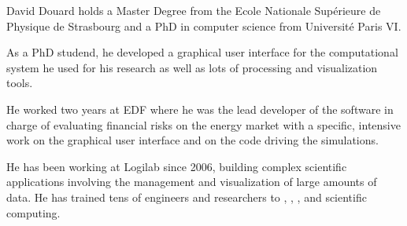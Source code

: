 \begin{participant}[type=PI,PM=6,gender=male]{David Douard}
  holds a Master Degree from the Ecole Nationale Sup\'{e}rieure de Physique de
  Strasbourg and a PhD in computer science from Universit\'{e} Paris VI.

  As a PhD studend, he developed a graphical user interface for the
  computational system he used for his research as well as lots of processing
  and visualization tools.

  He worked two years at EDF where he was the lead developer of the software in
  charge of evaluating financial risks on the energy market with a specific,
  intensive work on the graphical user interface and on the code driving the
  simulations.

  He has been working at Logilab since 2006, building complex scientific
  applications involving the management and visualization of large amounts of
  data. He has trained tens of engineers and researchers to ,
  , ,
   and scientific computing.
\end{participant}
